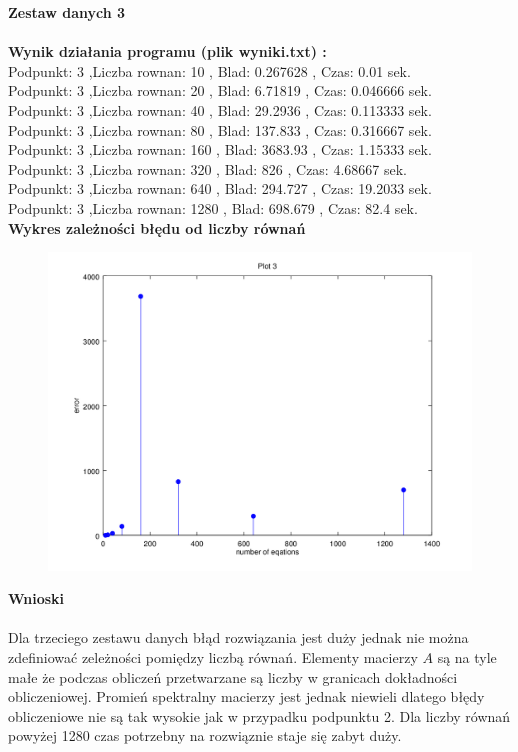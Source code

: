 \documentclass[a4paper, 11pt]{article}
\begin{document}
\vspace{1cm}
\textbf{Zestaw danych 3}\\
\\

\textbf{Wynik działania programu (plik wyniki.txt) :} \\
Podpunkt: 3 ,Liczba rownan: 10 , Blad: 0.267628 , Czas: 0.01 sek. \\
Podpunkt: 3 ,Liczba rownan: 20 , Blad: 6.71819 , Czas: 0.046666 sek. \\
Podpunkt: 3 ,Liczba rownan: 40 , Blad: 29.2936 , Czas: 0.113333 sek. \\
Podpunkt: 3 ,Liczba rownan: 80 , Blad: 137.833 , Czas: 0.316667 sek. \\
Podpunkt: 3 ,Liczba rownan: 160 , Blad: 3683.93 , Czas: 1.15333 sek. \\
Podpunkt: 3 ,Liczba rownan: 320 , Blad: 826 , Czas: 4.68667 sek. \\
Podpunkt: 3 ,Liczba rownan: 640 , Blad: 294.727 , Czas: 19.2033 sek.\\ 
Podpunkt: 3 ,Liczba rownan: 1280 , Blad: 698.679 , Czas: 82.4 sek. \\


\vspace{1cm}
\textbf{Wykres zależności błędu od liczby równań}\\
\begin{figure}[th]
\includegraphics[width=\textwidth]{wykres3}
\end{figure}

\vspace{1cm}
\textbf{Wnioski}\\
\\
Dla trzeciego zestawu danych błąd rozwiązania jest duży jednak nie można zdefiniować zeleżności pomiędzy liczbą równań. Elementy macierzy $A$ są na tyle małe że podczas obliczeń przetwarzane są liczby w granicach dokładności obliczeniowej. Promień spektralny macierzy jest jednak niewieli dlatego błędy obliczeniowe nie są tak wysokie jak w przypadku podpunktu 2. Dla liczby równań powyżej 1280 czas potrzebny na rozwiąznie staje się zabyt duży.
\end{document}
